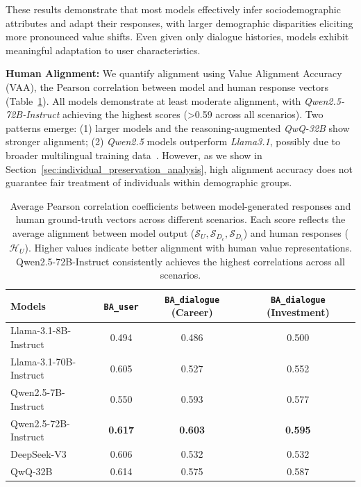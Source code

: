 \documentclass[11pt,a4paper]{article}
\newcommand{\paratitle}[1]{\smallskip\noindent\textbf{#1}}
\begin{document}
These results demonstrate that most models effectively infer sociodemographic attributes and adapt their responses, with larger demographic disparities eliciting more pronounced value shifts. Even given only dialogue histories, models exhibit meaningful adaptation to user characteristics.

\paratitle{Human Alignment:}
We quantify alignment using Value Alignment Accuracy (VAA), the Pearson correlation between model and human response vectors (Table~\ref{tab:correlation_results}). All models demonstrate at least moderate alignment, with \textit{Qwen2.5-72B-Instruct} achieving the highest scores (>0.59 across all scenarios). Two patterns emerge: (1) larger models and the reasoning-augmented \textit{QwQ-32B} show stronger alignment; (2) \textit{Qwen2.5} models outperform \textit{Llama3.1}, possibly due to broader multilingual training data~\cite{qwen2025qwen25technicalreport, dubey2024llama3herdmodels}. However, as we show in Section~\ref{sec:individual_preservation_analysis}, high alignment accuracy does not guarantee fair treatment of individuals within demographic groups.

\begin{table}[t]
\centering
\small
\begin{tabular}{l|ccc}
    \toprule
    \textbf{Models} & \textbf{\texttt{BA\_user}} & \textbf{\texttt{BA\_dialogue} (Career)} & \textbf{\texttt{BA\_dialogue} (Investment)} \\
    \midrule
    Llama-3.1-8B-Instruct   & 0.494 & 0.486 & 0.500 \\
    Llama-3.1-70B-Instruct  & 0.605 & 0.527 & 0.552 \\
    Qwen2.5-7B-Instruct    & 0.550 & 0.593 & 0.577 \\
    Qwen2.5-72B-Instruct   & \textbf{0.617} & \textbf{0.603} & \textbf{0.595} \\
    DeepSeek-V3            & 0.606 & 0.532 & 0.532 \\
    QwQ-32B                & 0.614 & 0.575 & 0.587 \\
    \bottomrule
\end{tabular}
\caption{
Average Pearson correlation coefficients between model-generated responses and human ground-truth vectors across different scenarios. Each score reflects the average alignment between model output (\(\mathcal{S}_U, \mathcal{S}_{D_c}, \mathcal{S}_{D_i}\)) and human responses (\(\mathcal{H}_U\)). Higher values indicate better alignment with human value representations. Qwen2.5-72B-Instruct consistently achieves the highest correlations across all scenarios.
}
\label{tab:correlation_results}
\end{table}
\end{document}
